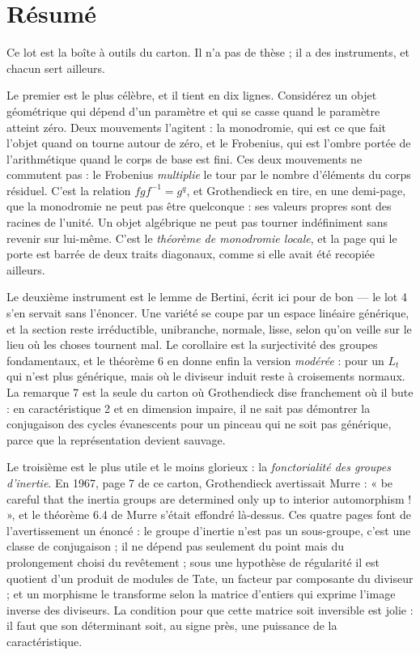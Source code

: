 \documentclass[11pt,a4paper]{article}
\begin{document}
\section*{Résumé}

\begin{resume}
Ce lot est la boîte à outils du carton. Il n'a pas de thèse ; il a des
instruments, et chacun sert ailleurs.

Le premier est le plus célèbre, et il tient en dix lignes. Considérez un objet
géométrique qui dépend d'un paramètre et qui se casse quand le paramètre
atteint zéro. Deux mouvements l'agitent : la monodromie, qui est ce que fait
l'objet quand on tourne autour de zéro, et le Frobenius, qui est l'ombre portée
de l'arithmétique quand le corps de base est fini. Ces deux mouvements ne
commutent pas : le Frobenius \emph{multiplie} le tour par le nombre
d'éléments du corps résiduel. C'est la relation $f g f^{-1} = g^{q}$, et
Grothendieck en tire, en une demi-page, que la monodromie ne peut pas être
quelconque : ses valeurs propres sont des racines de l'unité. Un objet
algébrique ne peut pas tourner indéfiniment sans revenir sur lui-même. C'est
le \emph{théorème de monodromie locale}, et la page qui le porte est barrée de
deux traits diagonaux, comme si elle avait été recopiée ailleurs.

Le deuxième instrument est le lemme de Bertini, écrit ici pour de bon --- le
lot 4 s'en servait sans l'énoncer. Une variété se coupe par un espace linéaire
générique, et la section reste irréductible, unibranche, normale, lisse, selon
qu'on veille sur le lieu où les choses tournent mal. Le corollaire est la
surjectivité des groupes fondamentaux, et le théorème 6 en donne enfin la
version \emph{modérée} : pour un $L_{t}$ qui n'est plus générique, mais où le
diviseur induit reste à croisements normaux. La remarque 7 est la seule du
carton où Grothendieck dise franchement où il bute : en caractéristique 2 et en
dimension impaire, il ne sait pas démontrer la conjugaison des cycles
évanescents pour un pinceau qui ne soit pas générique, parce que la
représentation devient sauvage.

Le troisième est le plus utile et le moins glorieux : la \emph{fonctorialité
des groupes d'inertie}. En 1967, page 7 de ce carton, Grothendieck avertissait
Murre : « be careful that the inertia groups are determined only up to interior
automorphism ! », et le théorème 6.4 de Murre s'était effondré là-dessus. Ces
quatre pages font de l'avertissement un énoncé : le groupe d'inertie n'est pas
un sous-groupe, c'est une classe de conjugaison ; il ne dépend pas seulement du
point mais du prolongement choisi du revêtement ; sous une hypothèse de
régularité il est quotient d'un produit de modules de Tate, un facteur par
composante du diviseur ; et un morphisme le transforme selon la matrice
d'entiers qui exprime l'image inverse des diviseurs. La condition pour que
cette matrice soit inversible est jolie : il faut que son déterminant soit,
au signe près, une puissance de la caractéristique.


\end{resume}
\end{document}
